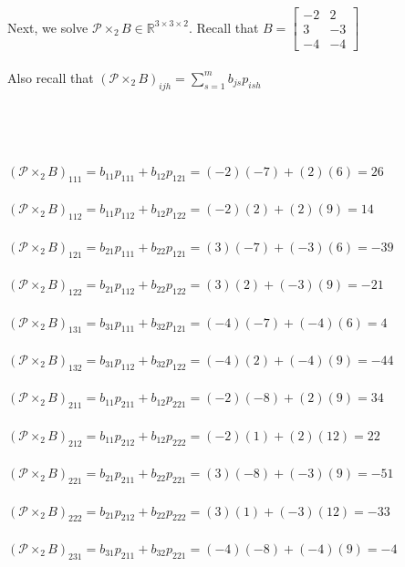 \documentclass[12pt]{article}
\begin{document}
\\~\\Next, we solve $\mathcal{P} \times_2 B\in\mathbb{R}^{3\times 3\times 2}$. Recall that $B=\left[\begin{array}{cc}{-2} & {2} \\ {3} & {-3} \\ {-4} & {-4}\end{array}\right]$ 
\\~\\Also recall that $\displaystyle\left(\mathcal{P} \times_{2} B\right)_{i j h}=\sum_{s=1}^{m} b_{j s} p_{i s h}$
\\~\\~\\~\\~\\$\left(\mathcal{P} \times_2 B\right)_{111}=b_{11}p_{111}+b_{12}p_{121}=(-2)(-7)+(2)(6)=26$
\\~\\$\left(\mathcal{P} \times_2 B\right)_{112}=b_{11}p_{112}+b_{12}p_{122}=(-2)(2)+(2)(9)=14$
\\~\\$\left(\mathcal{P} \times_2 B\right)_{121}=b_{21}p_{111}+b_{22}p_{121}=(3)(-7)+(-3)(6)=-39$
\\~\\$\left(\mathcal{P} \times_2 B\right)_{122}=b_{21}p_{112}+b_{22}p_{122}=(3)(2)+(-3)(9)=-21$
\\~\\$\left(\mathcal{P} \times_2 B\right)_{131}=b_{31}p_{111}+b_{32}p_{121}=(-4)(-7)+(-4)(6)=4$
\\~\\$\left(\mathcal{P} \times_2 B\right)_{132}=b_{31}p_{112}+b_{32}p_{122}=(-4)(2)+(-4)(9)=-44$
\\~\\$\left(\mathcal{P} \times_2 B\right)_{211}=b_{11}p_{211}+b_{12}p_{221}=(-2)(-8)+(2)(9)=34$
\\~\\$\left(\mathcal{P} \times_2 B\right)_{212}=b_{11}p_{212}+b_{12}p_{222}=(-2)(1)+(2)(12)=22$
\\~\\$\left(\mathcal{P} \times_2 B\right)_{221}=b_{21}p_{211}+b_{22}p_{221}=(3)(-8)+(-3)(9)=-51$
\\~\\$\left(\mathcal{P} \times_2 B\right)_{222}=b_{21}p_{212}+b_{22}p_{222}=(3)(1)+(-3)(12)=-33$
\\~\\$\left(\mathcal{P} \times_2 B\right)_{231}=b_{31}p_{211}+b_{32}p_{221}=(-4)(-8)+(-4)(9)=-4$
\end{document}
